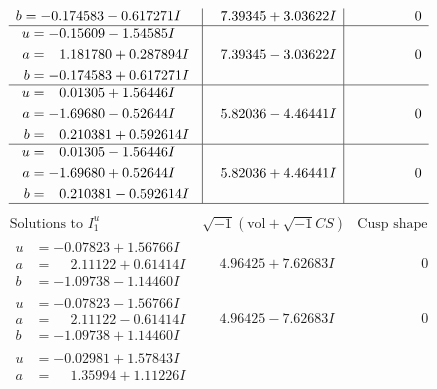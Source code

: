 \documentclass[1p]{elsarticle_modified}
\theoremstyle{definition}
\newcommand{\I}{\sqrt{-1}}
\begin{document}
$$\begin{array}{c|c|c}
\begin{aligned}
b &= -0.174583 - 0.617271 I\end{aligned}
 & \phantom{-}7.39345 + 3.03622 I & \phantom{-0.000000 } 0 \\ \hline\begin{aligned}
u &= -0.15609 - 1.54585 I \\
a &= \phantom{-}1.181780 + 0.287894 I \\
b &= -0.174583 + 0.617271 I\end{aligned}
 & \phantom{-}7.39345 - 3.03622 I & \phantom{-0.000000 } 0 \\ \hline\begin{aligned}
u &= \phantom{-}0.01305 + 1.56446 I \\
a &= -1.69680 - 0.52644 I \\
b &= \phantom{-}0.210381 + 0.592614 I\end{aligned}
 & \phantom{-}5.82036 - 4.46441 I & \phantom{-0.000000 } 0 \\ \hline\begin{aligned}
u &= \phantom{-}0.01305 - 1.56446 I \\
a &= -1.69680 + 0.52644 I \\
b &= \phantom{-}0.210381 - 0.592614 I\end{aligned}
 & \phantom{-}5.82036 + 4.46441 I & \phantom{-0.000000 } 0\\
 \hline 
 \end{array}$$\newpage$$\begin{array}{c|c|c}  
\text{Solutions to }I^u_{1}& \I (\text{vol} + \sqrt{-1}CS) & \text{Cusp shape}\\
 \hline 
\begin{aligned}
u &= -0.07823 + 1.56766 I \\
a &= \phantom{-}2.11122 + 0.61414 I \\
b &= -1.09738 - 1.14460 I\end{aligned}
 & \phantom{-}4.96425 + 7.62683 I & \phantom{-0.000000 } 0 \\ \hline\begin{aligned}
u &= -0.07823 - 1.56766 I \\
a &= \phantom{-}2.11122 - 0.61414 I \\
b &= -1.09738 + 1.14460 I\end{aligned}
 & \phantom{-}4.96425 - 7.62683 I & \phantom{-0.000000 } 0 \\ \hline\begin{aligned}
u &= -0.02981 + 1.57843 I \\
a &= \phantom{-}1.35994 + 1.11226 I \\

\end{aligned}
\end{array}$$
\end{document}
